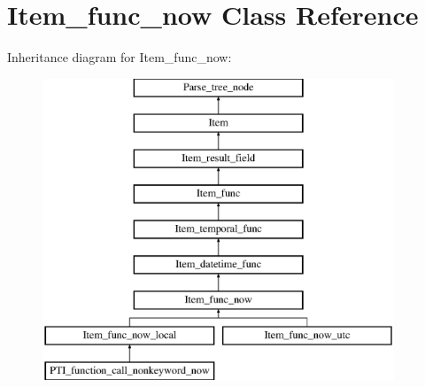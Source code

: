 \hypertarget{classItem__func__now}{}\section{Item\+\_\+func\+\_\+now Class Reference}
\label{classItem__func__now}
Inheritance diagram for Item\+\_\+func\+\_\+now\+:\begin{figure}[H]
\begin{center}
\leavevmode
\includegraphics[height=9.000000cm]{classItem__func__now}
\end{center}
\end{figure}
